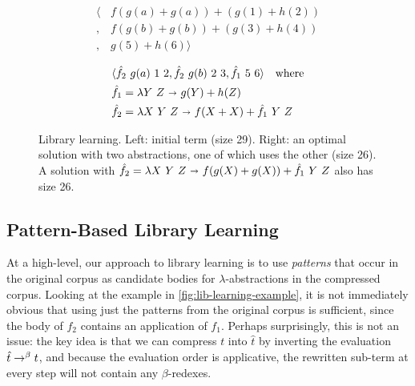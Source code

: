 \begin{figure}
  \begin{minipage}{.5\textwidth}
    \begin{align*}
      \langle &f(g(a) + g(a)) + (g(1) + h(2))\\
      ,\ &f(g(b) + g(b)) + (g(3) + h(4))\\
      ,\ &g(5) + h(6) \rangle
    \end{align*}
  \end{minipage}%
  \begin{minipage}{.5\textwidth}
    \begin{align*}
      &\langle \hat{f}_2\ g(a)\ 1\ 2, \hat{f}_2\ g(b)\ 2\ 3, \hat{f}_1\ 5\ 6\rangle\quad \text{where}\\
      &\hat{f}_1 = \lambda Y\ Z \ \mathbf{\shortrightarrow}\  g(Y) + h(Z)\\
      &\hat{f}_2 = \lambda X\ Y\ Z \ \mathbf{\shortrightarrow}\  f(X + X) + \hat{f}_1\ Y\ Z
    \end{align*}
  \end{minipage}
  \caption{Library learning.
           Left: initial term (size 29).
           Right: an optimal solution with two abstractions, one of which uses the other (size 26).
           A solution with $\hat{f}_2 = \lambda X\ Y\ Z \ \mathbf{\shortrightarrow}\  f(g(X) + g(X)) + \hat{f}_1\ Y\ Z$ also has size 26.}\label{fig:lib-learning-example}
\end{figure}


\subsection{Pattern-Based Library Learning}

At a high-level, our approach to library learning
is to use \emph{patterns} that occur in the original corpus
as candidate bodies for $\lambda$-abstractions in the compressed corpus.
%
Looking at the example in \autoref{fig:lib-learning-example},
it is not immediately obvious that using just the patterns from the original corpus is sufficient,
since the body of $f_2$ contains an application of $f_1$.
%
Perhaps surprisingly, this is not an issue:
the key idea is that we can compress $t$ into $\hat{t}$ by inverting the evaluation $\hat{t} \rightarrow^{\beta} t$,
and because the evaluation order is applicative,
the rewritten sub-term at every step will not contain any $\beta$-redexes.

